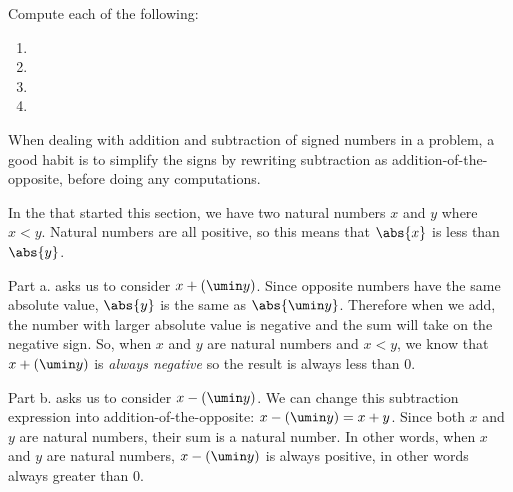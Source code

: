 \begin{boxedex}
Compute each of the following:

\begin{enumerate}[itemsep=10pt]
\item {}

\item {}

\item {}

\item {}
\end{enumerate}
\end{boxedex}

When dealing with addition and subtraction of signed numbers in a problem, a good habit is to simplify the signs by rewriting subtraction as addition-of-the-opposite, before doing any computations.

\begin{boxedex}
In the  that started this section, we have two natural numbers $x$ and $y$ where $x < y$. Natural numbers are all positive, so this means that $\abs{x}$ is less than $\abs{y}$.

Part a. asks us to consider $x+(\umin y)$. Since opposite numbers have the same absolute value, $\abs{y}$ is the same as $\abs{\umin y}$. Therefore when we add, the number with larger absolute value is negative and the sum will take on the negative sign. So, when $x$ and $y$ are natural numbers and $x < y$, we know that $x+(\umin y)$ is {\em always negative} so the result is always less than 0.

Part b. asks us to consider $x-(\umin y)$. We can change this subtraction expression into addition-of-the-opposite: $x-(\umin y) = x+y$. Since both $x$ and $y$ are natural numbers, their sum is a natural number. In other words, when $x$ and $y$ are natural numbers, $x-(\umin y)$ is always positive, in other words always greater than 0.
\end{boxedex}

